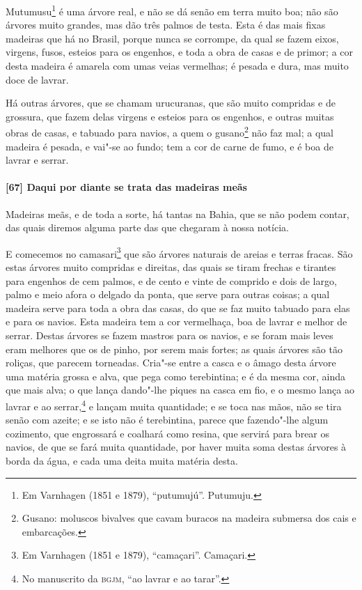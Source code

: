 \begin{linenumbers}
Mutumusu\footnote{ Em Varnhagen (1851 e 1879), ``putumujú''. Putumuju.} é uma árvore real,
e não se dá senão em terra muito boa; não são árvores muito grandes, mas dão três palmos
de testa. Esta é das mais fixas madeiras que há no Brasil, porque nunca se corrompe, da
qual se fazem eixos, virgens, fusos, esteios para os engenhos, e toda a obra de casas e de
primor; a cor desta madeira é amarela com umas veias vermelhas; é pesada e dura, mas muito
doce de lavrar.

Há outras árvores, que se chamam urucuranas, que são muito compridas e de grossura, que
fazem delas virgens e esteios para os engenhos, e outras muitas obras de casas, e tabuado
para navios, a quem o gusano\footnote{ Gusano: moluscos bivalves que cavam buracos na
madeira submersa dos cais e embarcações.} não faz mal; a qual madeira é pesada, e vai"-se
ao fundo; tem a cor de carne de fumo, e é boa de lavrar e serrar.

\paragraph{[67] Daqui por diante se trata das madeiras meãs}\quad
Madeiras meãs, e de toda a sorte, há tantas na Bahia, que se não podem contar, das quais
diremos alguma parte das que chegaram à nossa notícia.

E comecemos no camasari\footnote{ Em Varnhagen (1851 e 1879), ``camaçari''. Camaçari.} que
são árvores naturais de areias e terras fracas. São estas árvores muito compridas e
direitas, das quais se tiram frechas e tirantes para engenhos de cem palmos, e de cento e
vinte de comprido e dois de largo, palmo e meio afora o delgado da ponta, que serve para
outras coisas; a qual madeira serve para toda a obra das casas, do que se faz muito
tabuado para elas e para os navios. Esta madeira tem a cor vermelhaça, boa de lavrar e
melhor de serrar. Destas árvores se fazem mastros para os navios, e se foram mais leves
eram melhores que os de pinho, por serem mais fortes; as quais árvores são tão roliças,
que parecem torneadas. Cria"-se entre a casca e o âmago desta árvore uma matéria grossa e
alva, que pega como terebintina; e é da mesma cor, ainda que mais alva; o que lança
dando"-lhe piques na casca em fio, e o mesmo lança ao lavrar e ao serrar,\footnote{ No
manuscrito da \textsc{bgjm}, ``ao lavrar e ao tarar''.} e lançam muita quantidade; e se
toca nas mãos, não se tira senão com azeite; e se isto não é terebintina, parece que
fazendo"-lhe algum cozimento, que engrossará e coalhará como resina, que servirá para brear
os navios, de que se fará muita quantidade, por haver muita soma destas árvores à borda da
água, e cada uma deita muita matéria desta.


\end{linenumbers}
